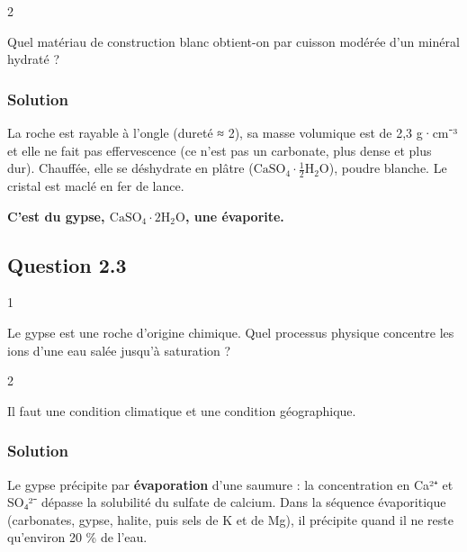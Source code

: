 \documentclass[11pt,a4paper]{article}
\begin{document}
\begin{indication}{2}

Quel matériau de construction blanc obtient-on par cuisson modérée d'un minéral hydraté ?

\end{indication}

\hypertarget{solution-12}{%
\subsubsection{Solution}\label{solution-12}}

La roche est rayable à l'ongle (dureté ≈ 2), sa masse volumique est de 2,3 g·cm⁻³ et elle ne fait pas effervescence (ce n'est pas un carbonate, plus dense et plus dur). Chauffée, elle se déshydrate en plâtre (\(\mathrm{CaSO_4\cdot\tfrac12H_2O}\)), poudre blanche. Le cristal est maclé en fer de lance.

\textbf{C'est du gypse, \(\mathrm{CaSO_4\cdot2H_2O}\), une évaporite.}

\hypertarget{question-2.3}{%
\subsection{Question 2.3}\label{question-2.3}}

\begin{indication}{1}

Le gypse est une roche d'origine chimique. Quel processus physique concentre les ions d'une eau salée jusqu'à saturation ?

\end{indication}

\begin{indication}{2}

Il faut une condition climatique et une condition géographique.

\end{indication}

\hypertarget{solution-13}{%
\subsubsection{Solution}\label{solution-13}}

Le gypse précipite par \textbf{évaporation} d'une saumure : la concentration en Ca²⁺ et SO₄²⁻ dépasse la solubilité du sulfate de calcium. Dans la séquence évaporitique (carbonates, gypse, halite, puis sels de K et de Mg), il précipite quand il ne reste qu'environ 20 \% de l'eau.
\end{document}
